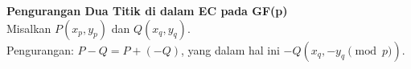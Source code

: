 \documentclass{article}
\begin{document}

\textbf{Pengurangan Dua Titik di dalam EC pada GF(p)}\ \\
Misalkan $P(x_p, y_p)$ dan $Q(x_q, y_q)$. \\
Pengurangan: $P - Q = P + (-Q)$, yang dalam hal ini $-Q(x_q, -y_q \pmod{p})$.
\end{document}

